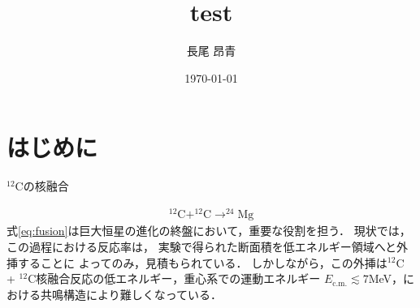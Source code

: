 \documentclass[a4paper,11pt]{ltjsarticle}
\begin{document}
\title{test}
\author{長尾 昂青}
\date{\today}
\maketitle

\tableofcontents

\newpage
\section{はじめに}

$^{12}$Cの核融合

\begin{align}\label{eq:fusion}
  ^{12} \text{C} + ^{12} \text{C} \rightarrow ^{24} \text{Mg}
\end{align}
式\ref{eq:fusion}は巨大恒星の進化の終盤において，重要な役割を担う．
現状では，この過程における反応率は，
実験で得られた断面積を低エネルギー領域へと外挿することに
よってのみ，見積もられている．
しかしながら，この外挿は$^{12}$C + $^{12}$C核融合反応の低エネルギー，重心系での運動エネルギー
$E_\text{c.m.} \lesssim 7$MeV，における共鳴構造により難しくなっている．
\end{document}
